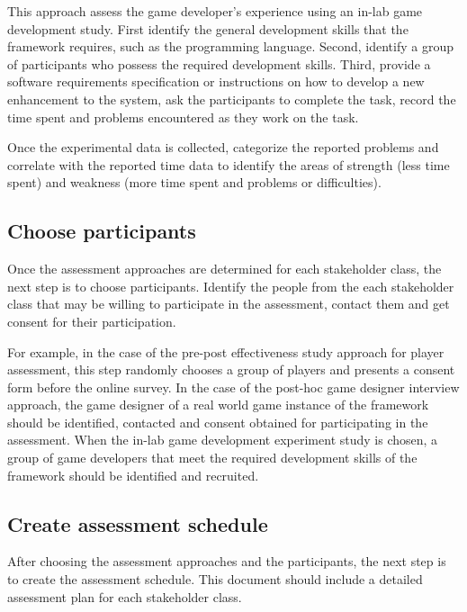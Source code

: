 \label{In-lab game development study}

This approach assess the game developer's experience using an in-lab game development study.  
First identify the general development skills that the framework requires, such as the programming language. 
Second, identify a group of participants who possess the required development skills. Third, provide 
a software requirements specification or instructions on how to develop a new enhancement to the system, ask the 
participants to complete the task, record the time spent and problems encountered as they work on the task.

Once the experimental data is collected, categorize the reported problems and correlate with the reported time data 
to identify the areas of strength (less time spent) and weakness (more time spent and problems or difficulties). 

\subsection {Choose participants}

Once the assessment approaches are determined for each stakeholder class, the next step is to choose participants. 
Identify the  people from the each stakeholder class that may be willing to participate in the assessment, contact them 
and get consent for their participation. 

For example, in the case of the pre-post effectiveness study approach for player assessment, this step randomly chooses a 
group of players and presents a consent form before the online survey.  In the case of the post-hoc game designer interview 
approach, the game designer of a real world game instance of the framework should be identified, contacted and consent obtained 
for participating in the assessment. When the in-lab game development experiment study is chosen, a group of game 
developers that meet the required development skills of the framework should be identified and recruited.

\subsection{Create assessment schedule}

After choosing the assessment approaches and the participants, the next step is to create the assessment 
schedule. This document should include a detailed assessment plan for 
each stakeholder class. 

